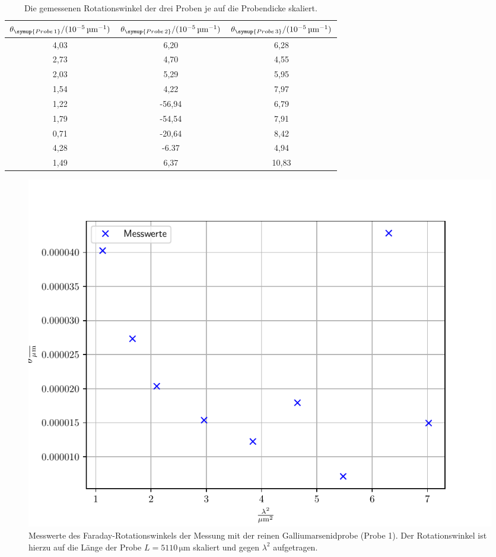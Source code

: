 \FloatBarrier
\begin{table}[h]
    \centering
    \caption{Die gemessenen Rotationswinkel der drei Proben je auf die Probendicke skaliert.}
    \label{tab:atab4}
    \begin{tabular}{c c c}
        \toprule
        {$\theta_{\symup{Probe\,1}}/(10^{-5}\,\si{\micro\meter}^{-1})$} & {$\theta_{\symup{Probe\,2}}/(10^{-5}\,\si{\micro\meter}^{-1})$} & {$\theta_{\symup{Probe\,3}}/(10^{-5}\,\si{\micro\meter}^{-1})$}\\
        \midrule
        4,03  & 6,20   &  6,28 \\
        2,73  & 4,70   &  4,55 \\
        2,03  & 5,29   &  5,95 \\
        1,54  & 4,22   &  7,97 \\
        1,22  & -56,94 &  6,79 \\
        1,79  & -54,54 &  7,91 \\
        0,71  & -20,64 &  8,42 \\
        4,28  & -6.37  &  4,94 \\
        1,49  & 6,37   &  10,83 \\
        \bottomrule 
    \end{tabular}
\end{table}
\FloatBarrier
\noindent
\FloatBarrier
\begin{figure}[h]
    \centering
    \includegraphics[width=1\textwidth]{Winkel_undotiert.pdf}
    \caption{Messwerte des Faraday-Rotationswinkels der Messung mit der reinen Galliumarsenidprobe (Probe 1). Der Rotationswinkel ist hierzu auf die Länge der Probe $L = 5110\, \si{\micro\meter}$ skaliert und gegen $\lambda ^2$ aufgetragen.}
    \label{fig:afig2}
\end{figure}
\FloatBarrier
\noindent

